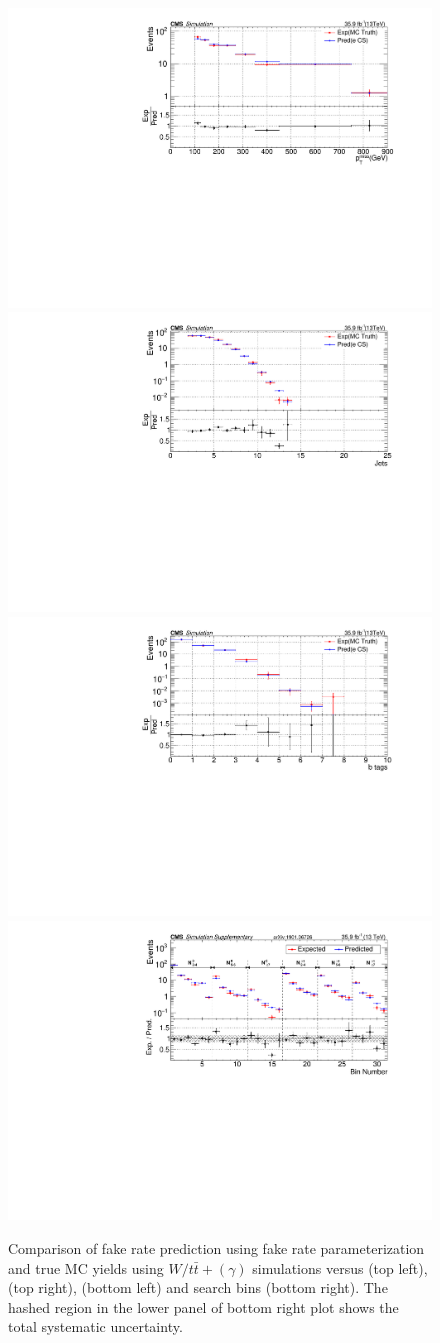 \begin{figure}[h!]                           
\centering
\includegraphics[width=0.48\linewidth]{../Figures/Chap3/fake_rate_closure/fakeRateClosure_met.pdf}
\includegraphics[width=0.48\linewidth]{../Figures/Chap3/fake_rate_closure/fakeRateClosure_njets.pdf}\\
\includegraphics[width=0.48\linewidth]{../Figures/Chap3/fake_rate_closure/fakeRateClosure_btags.pdf}
\includegraphics[width=0.48\linewidth]{../Figures/Chap3/anaPublic/fakerateClosure}
\captionsetup{width=.9\linewidth}
\caption{Comparison of fake rate prediction using fake rate parameterization
and true MC yields using $W/t\bar{t}+(\gamma)$ simulations versus \ptmiss (top left), 
\nj (top right), \nb (bottom left) and search bins (bottom right). The hashed region in the lower panel 
of bottom right plot shows the total systematic uncertainty.}
\label{fig:fakeRateClosure}
\end{figure}

